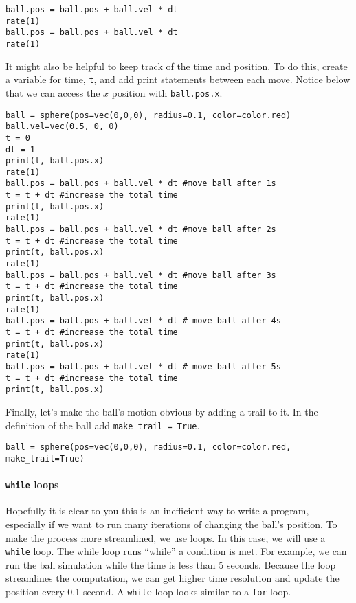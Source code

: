 \begin{verbatim}
ball.pos = ball.pos + ball.vel * dt
rate(1)
ball.pos = ball.pos + ball.vel * dt
rate(1)
\end{verbatim}

It might also be helpful to keep track of the time and position. To do this, create a variable for time, \texttt{t}, and add print statements between each move. Notice below that we can access the $x$ position with \texttt{ball.pos.x}.

\begin{verbatim}
ball = sphere(pos=vec(0,0,0), radius=0.1, color=color.red)
ball.vel=vec(0.5, 0, 0)
t = 0
dt = 1
print(t, ball.pos.x)
rate(1)
ball.pos = ball.pos + ball.vel * dt #move ball after 1s
t = t + dt #increase the total time
print(t, ball.pos.x)
rate(1)
ball.pos = ball.pos + ball.vel * dt #move ball after 2s
t = t + dt #increase the total time
print(t, ball.pos.x)
rate(1)
ball.pos = ball.pos + ball.vel * dt #move ball after 3s
t = t + dt #increase the total time
print(t, ball.pos.x)
rate(1)
ball.pos = ball.pos + ball.vel * dt # move ball after 4s
t = t + dt #increase the total time
print(t, ball.pos.x)
rate(1)
ball.pos = ball.pos + ball.vel * dt # move ball after 5s
t = t + dt #increase the total time
print(t, ball.pos.x)
\end{verbatim}

Finally, let's make the ball's motion obvious by adding a trail to it. In the definition of the ball add \texttt{make\_trail = True}.

\begin{verbatim}
ball = sphere(pos=vec(0,0,0), radius=0.1, color=color.red, make_trail=True)
\end{verbatim}

\paragraph{\texttt{while} loops}

Hopefully it is clear to you this is an inefficient way to write a program, especially if we want to run many iterations of changing the ball's position. To make the process more streamlined, we use loops. In this case, we will use a \texttt{while} loop. The while loop runs ``while'' a condition is met. For example, we can run the ball simulation while the time is less than 5 seconds. Because the loop streamlines the computation, we can get higher time resolution and update the position every 0.1 second. A \texttt{while} loop looks similar to a \texttt{for} loop.

